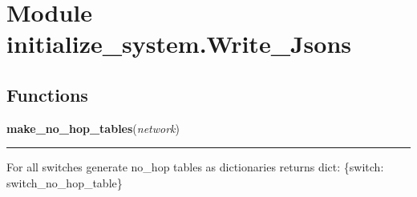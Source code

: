 %
%
%


\section{Module initialize\_system.Write\_Jsons}

    \label{initialize_system:Write_Jsons}


  \subsection{Functions}

    \label{initialize_system:Write_Jsons:make_no_hop_tables}

    \vspace{0.5ex}

\hspace{.8\funcindent}\begin{boxedminipage}{\funcwidth}

    \raggedright \textbf{make\_no\_hop\_tables}(\textit{network})

    \vspace{-1.5ex}

    \rule{\textwidth}{0.5\fboxrule}
\setlength{\parskip}{2ex}
    For all switches generate no\_hop tables as dictionaries returns dict: 
    \{switch: switch\_no\_hop\_table\}

\setlength{\parskip}{1ex}
    \end{boxedminipage}

    \label{initialize_system:Write_Jsons:make_no_hop_table}


